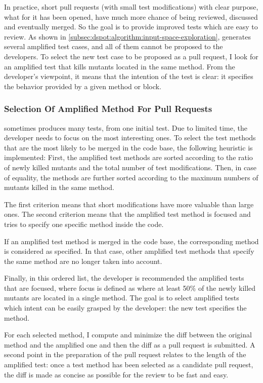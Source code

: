 In practice, short pull requests (\ie with small test modifications) with clear purpose, \ie what for it has been opened, have much more chance of being reviewed, discussed and eventually merged. 
So the goal is to provide improved tests which are easy to review.
As shown in \autoref{subsec:dspot:algorithm:input-space-exploration}, \dspot generates several amplified test cases, and all of them cannot be proposed to the developers.
To select the new test case to be proposed as a pull request, I look for an amplified test that kills mutants located in the same method.
From the developer's viewpoint, it means that the intention of the test is clear: it specifies the behavior provided by a given method or block.

\subsubsection{Selection Of Amplified Method For Pull Requests}
\label{subsubsec:test-improvement:experiment-results:rq1:selection}

\dspot sometimes produces many tests, from one initial test.
Due to limited time, the developer needs to focus on the most interesting ones.
To select the test methods that are the most likely to be merged in the code base, the following heuristic is implemented:
First, the amplified test methods are sorted according to the ratio of newly killed mutants and the total number of test modifications.
Then, in case of equality, the methods are further sorted according to the maximum numbers of mutants killed in the same method.

The first criterion means that short modifications have more valuable than large ones.
The second criterion means that the amplified test method is focused and tries to specify one specific method inside the code.

If an amplified test method is merged in the code base, the corresponding method is considered as specified. 
In that case, other amplified test methods that specify the same method are no longer taken into account.

Finally, in this ordered list, the developer is recommended the amplified tests that are focused, where focus is defined as where at least 50\% of the newly killed mutants are located in a single method. 
The goal is to select amplified tests which intent can be easily grasped by the developer: the new test specifies the method.

For each selected method, I compute and minimize the diff between the original method and the amplified one and then the diff as a pull request is submitted.
A second point in the preparation of the pull request relates to the length of the amplified test: 
once a test method has been selected as a candidate pull request, the diff is made as concise as possible for the review to be fast and easy.

